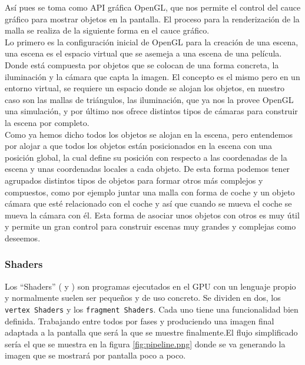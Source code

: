 Así pues se toma como API gráfica OpenGL, que nos permite el control del cauce gráfico para mostrar objetos en la pantalla. 
El proceso para la renderización de la malla se realiza de la siguiente forma en el cauce gráfico.\\

Lo primero es la configuración inicial de OpenGL para la creación de una escena, una escena es el espacio virtual que se asemeja a una escena de una película. Donde está compuesta por objetos que se colocan de una forma concreta, la iluminación y la cámara que capta la imagen. El concepto es el mismo pero en un entorno virtual, se requiere un espacio donde se alojan los objetos, en nuestro caso son las mallas de triángulos, las iluminación, que ya nos la provee OpenGL una simulación, y por último nos ofrece distintos tipos de cámaras para construir la escena por completo.\\

Como ya hemos dicho todos los objetos se alojan en la escena, pero entendemos por alojar a que todos los objetos están posicionados en la escena con una posición global, la cual define su posición con respecto a las coordenadas de la escena y unas coordenadas locales a cada objeto. De esta forma podemos tener agrupados distintos tipos de objetos para formar otros más complejos y compuestos, como por ejemplo juntar  una malla con forma de coche y un objeto cámara que esté relacionado con el coche y así que cuando se mueva el coche se mueva la cámara con él. Esta forma de asociar unos objetos con otros es muy útil y permite un gran control para construir escenas muy grandes y complejas como deseemos.

\subsubsection{ Shaders}

Los ``Shaders'' (\cite{LearnOpenGLShaders} y \cite{ShaderOpenGLWiki}) son programas ejecutados en el GPU con un lenguaje propio y normalmente suelen ser pequeños y de uso concreto. Se dividen en dos, los \texttt{vertex Shaders} y los \texttt{fragment Shaders}. Cada uno tiene una funcionalidad bien definida. Trabajando entre todos por fases y produciendo una imagen final adaptada a la pantalla que será la que se muestre finalmente.El flujo simplificado sería el que se muestra en la figura \ref{fig:pipeline.png} donde se va generando la imagen que se mostrará por pantalla poco a poco. \\

